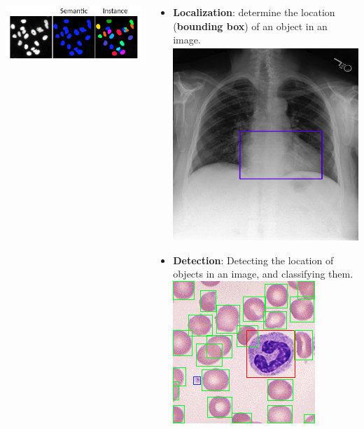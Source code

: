 \documentclass[9pt, aspectratio=169]{beamer}
\begin{document}
\begin{frame}
\begin{columns}[t]
\begin{column}{.5\textwidth}
\begin{itemize}
                      \centering
                      \includegraphics[width=.7\textwidth]{semantic_vs_instance_bio.jpg}
            \end{itemize}
        \end{column}
        \pause
        \begin{column}{.5\textwidth}
            \begin{itemize}
                \item \textbf{Localization}: determine the location (\textbf{bounding box}) of an object in an image.
                      \centering
                      \includegraphics[width=.3\textwidth]{Nkechinyere_2021_localization.png}
                      \pause
                \item \raggedright \textbf{Detection}: Detecting the location of objects in an image, and classifying them.
                      \centering
                      \includegraphics[width=.4\textwidth]{objectdetection.png}
            \end{itemize}
        \end{column}
    \end{columns}
\end{frame}
\end{document}
